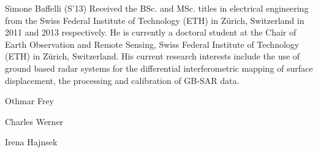 \begin{IEEEbiography}{Simone Baffelli}
(S'13)
Received the BSc. and MSc. titles in electrical engineering from the Swiss Federal Institute of Technology (ETH) in Z\"{u}rich, Switzerland in 2011 and 2013 respectively. He is currently a doctoral student at the Chair of Earth Observation
and Remote Sensing, Swiss Federal Institute of Technology (ETH) in Z\"{u}rich, Switzerland. His current research interests include the use of ground based radar systems for the differential interferometric mapping of surface displacement, the processing and calibration of GB-SAR data.
\end{IEEEbiography}
\begin{IEEEbiography}{Othmar Frey}
\end{IEEEbiography}
\begin{IEEEbiography}{Charles Werner}
\end{IEEEbiography}
\begin{IEEEbiography}{Irena Hajnsek }
\end{IEEEbiography}